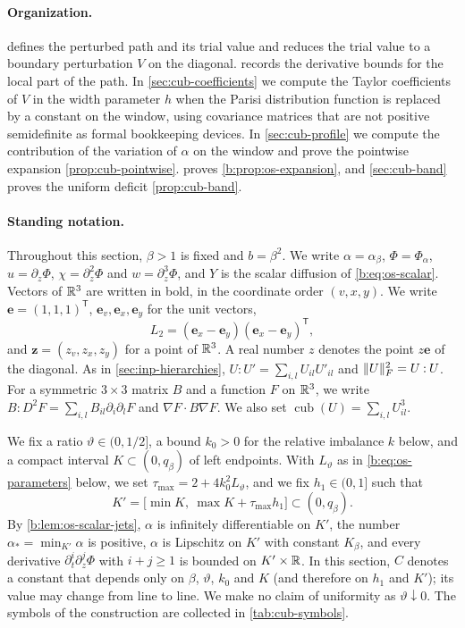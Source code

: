 \paragraph{Organization.}
 defines the perturbed path and its trial value and reduces
the trial value to a boundary perturbation $V$ on the diagonal.  records
the derivative bounds for the local part of the path. In
\cref{sec:cub-coefficients} we compute the Taylor coefficients of $V$ in the
width parameter $h$ when the Parisi distribution function is replaced by a constant on
the window, using covariance matrices that are not positive semidefinite as
formal bookkeeping devices. In \cref{sec:cub-profile} we compute the
contribution of the variation of $\alpha$ on the window and prove the
pointwise expansion \cref{prop:cub-pointwise}.  proves
\cref{b:prop:os-expansion}, and \cref{sec:cub-band} proves the uniform deficit
\cref{prop:cub-band}.

\paragraph{Standing notation.}
Throughout this section, $\beta>1$ is fixed and $b=\beta^2$. We write
$\alpha=\alpha_\beta$, $\Phi=\Phi_\alpha$, $u=\partial_z\Phi$,
$\chi=\partial_z^2\Phi$ and $w=\partial_z^3\Phi$, and $Y$ is the scalar
diffusion of \eqref{b:eq:os-scalar}. Vectors of $\mathbb R^3$ are written in bold,
in the coordinate order $(v,x,y)$. We write $\mathbf e=(1,1,1)^{\mathsf T}$,
$\mathbf e_v,\mathbf e_x,\mathbf e_y$ for the unit vectors,
\[
 L_2=(\mathbf e_x-\mathbf e_y)(\mathbf e_x-\mathbf e_y)^{\mathsf T},
\]
and $\mathbf z=(z_v,z_x,z_y)$ for a point of $\mathbb R^3$. A real number $z$
denotes the point $z\mathbf e$ of the diagonal. As in
\cref{sec:inp-hierarchies}, $U\mathbin:U'=\sum_{i,l}U_{il}U'_{il}$ and
$\lVert U\rVert_F^2=U\mathbin:U$. For a symmetric $3\times3$ matrix $B$ and a function
$F$ on $\mathbb R^3$, we write $B\mathbin:D^2F=\sum_{i,l}B_{il}\partial_i\partial_lF$
and $\nabla F\cdot B\nabla F$. We also set
$\operatorname{cub}(U)=\sum_{i,l}U_{il}^3$.

We fix a ratio $\vartheta\in(0,1/2]$, a bound $k_0>0$ for the relative
imbalance $k$ below, and a compact interval $K\subset(0,q_\beta)$ of left
endpoints. With $L_\vartheta$ as in \eqref{b:eq:os-parameters} below, we set
$\tau_{\max}=2+4k_0^2L_\vartheta$, and we fix $h_1\in(0,1]$ such that
\[
 K'=\bigl[\min K,\ \max K+\tau_{\max}h_1\bigr]\subset(0,q_\beta).
\]
By \cref{b:lem:os-scalar-jets}, $\alpha$ is infinitely differentiable on
$K'$, the number $\alpha_*=\min_{K'}\alpha$ is positive, $\alpha$ is
Lipschitz on $K'$ with constant $K_\beta$, and every derivative
$\partial_t^i\partial_z^j\Phi$ with $i+j\ge1$ is bounded on $K'\times\mathbb R$. In
this section, $C$ denotes a constant that depends only on $\beta$,
$\vartheta$, $k_0$ and $K$ (and therefore on $h_1$ and $K'$); its value may
change from line to line. We make no claim of uniformity as
$\vartheta\downarrow0$. The symbols of the construction are collected in
\cref{tab:cub-symbols}.

